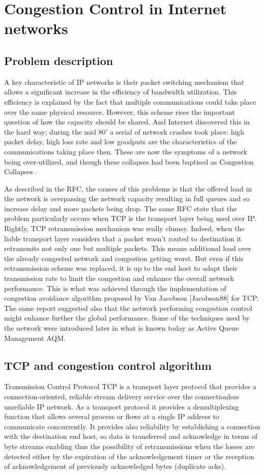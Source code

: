 \section{Congestion Control in Internet networks}
\subsection{Problem description}
A key characteristic of IP networks is their packet switching mechanism that allows a significant increase in the efficiency of bandwidth utilization. This efficiency is explained by the fact that multiple communications could take place over the same physical resource. However, this scheme rises the important question of how the capacity should be shared. And Internet discovered this in the hard way; during the mid 80' a serial of network crashes took place: high packet delay, high loss rate and  low  goodputs are the characteristics of the communications taking place then. These are now the symptoms of a network being over-utilized, and though these collapses had been baptised as Congestion Collapses \cite{RFC896}. 

As described in the RFC, the causes of this problems is that the offered load in the network is overpassing the network capacity resulting in full queues and so increase delay and more packets being drop. The same RFC state that the problem particularly occurs when TCP is the transport layer being used over IP. Rightly, TCP retransmission mechanism was really clumsy. Indeed, when the liable transport layer considers that a packet wasn't routed to destination it retransmits not only one but multiple packets. This means additional load over the already congested network and congestion getting worst. But even if this retransmission scheme was replaced, it is up to the end host to adapt their transmission rate to limit the congestion and enhance the overall network performance. This is what was achieved through the implementation of congestion avoidance algorithm proposed by Van Jacobson [Jacobson88] for TCP. The same report suggested also that the network performing congestion control might enhance further the global performance. Some of the techniques used by the network were introduced later in what is known today as Active Queue Management AQM.
\subsection{TCP and congestion control algorithm}
Transmission Control Protocol TCP is a transport layer protocol that provides a connection-oriented, reliable stream delivery service over the connectionless unreliable IP network. As a transport protocol it provides a demultiplexing function that allows several process or flows at a single IP address to communicate concurrently. It provides also reliability by establishing a connection with the destination end host, so data is transferred and acknowledge in terms of byte streams enabling thus the possibility of retransmissions when the losses are detected either by the expiration of the acknowledgement timer or the reception of acknowledgement of previously acknowledged bytes (duplicate acks).

